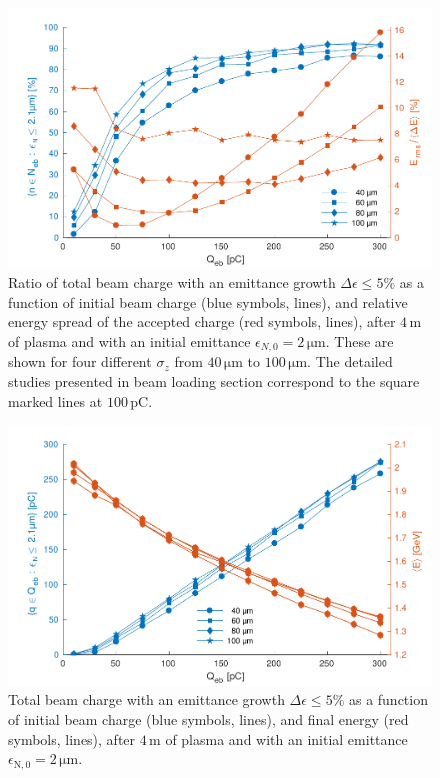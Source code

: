 \documentclass[aps,prstab,reprint,amsmath,amssymb,groupedaddress]{revtex4-1}
\newcommand{\unit}[1]{\,\mathrm{#1}}
\begin{document}
\begin{figure}[hbt]
    \includegraphics[width=\linewidth,trim={2mm 0mm 2mm 0mm},clip]{figures/beamQuality}
    \caption{\label{Fig:BeamQ} Ratio of total beam charge with an emittance growth $\Delta\epsilon \leq 5\%$ as a
        function of initial beam charge (blue symbols, lines), and relative energy spread of the accepted charge (red
        symbols, lines), after $4\unit{m}$ of plasma and with an initial emittance $\epsilon_{N,0}=2\unit{\mu m}$. These
        are shown for four different $\sigma_{z}$ from $40\unit{\mu m}$ to $100\unit{\mu m}$. The detailed studies
        presented in beam loading section correspond to the square marked lines at $100\unit{pC}$.}
\end{figure}

\begin{figure}[hbt]
    \includegraphics[width=\linewidth,trim={2mm 0mm 2mm 0mm},clip]{figures/beamQualityAbs}
    \caption{\label{Fig:BeamQAbs} Total beam charge with an emittance growth $\Delta\epsilon \leq 5\%$ as a function of
        initial beam charge (blue symbols, lines), and final %
        energy (red symbols, lines), after $4\unit{m}$ of plasma and with an initial emittance
        $\epsilon_{\mathrm{N},0}=2\unit{\mu m}$.}
\end{figure}
\end{document}

